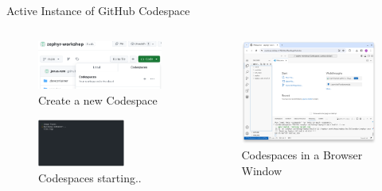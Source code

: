 \documentclass[10pt, aspectratio=169]{beamer}
\begin{document}
\begin{frame}[fragile]{Active Instance of GitHub Codespace}
  \begin{columns}
    \begin{column}{0.4\textwidth}
      \begin{figure}
        \includegraphics[width=\textwidth]{images/codespaces_how_to_start.png}
        \caption{Create a new Codespace}
      \end{figure}
      \begin{figure}
        \includegraphics[width=0.7\textwidth]{images/codespaces_setting_up.png}
        \caption{Codespaces starting..}
      \end{figure}
    \end{column}
    \begin{column}{0.6\textwidth}
      \begin{figure}
        \includegraphics[width=\textwidth]{images/codespaces_open.png}
        \caption{Codespaces in a Browser Window}
      \end{figure}
    \end{column}
  \end{columns}
\end{frame}
\end{document}
